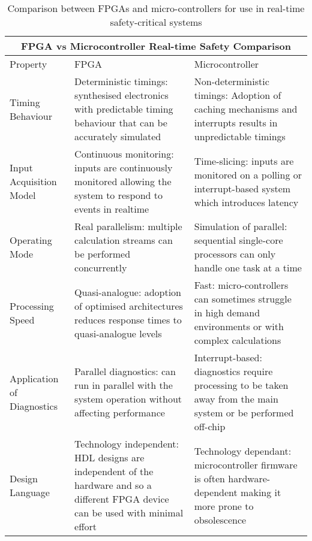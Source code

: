 \begin{table}[t]
\centering
\begin{tabular}{ |p{}|p{}|p{}| }
 \hline
 \multicolumn{3}{|c|}{FPGA vs Microcontroller Real-time Safety Comparison} \\
 \hline
 Property & FPGA & Microcontroller \\
 \hline
 \hline
 Timing Behaviour & Deterministic timings: synthesised electronics with predictable timing behaviour that can be accurately simulated\cite{SalewskiExploring, jabeen, Dubey, tahoori, al-mahmood}  & Non-deterministic timings: Adoption of caching mechanisms and interrupts results in unpredictable timings\cite{SalewskiExploring, wells}   \\
 \hline
 Input Acquisition Model & Continuous monitoring: inputs are continuously monitored allowing the system to respond to events in realtime\cite{SalewskiExploring} & Time-slicing: inputs are monitored on a polling or interrupt-based system which introduces latency\cite{SalewskiExploring} \\

 \hline
 Operating Mode & Real parallelism: multiple calculation streams can be performed concurrently\cite{SalewskiExploring, Gomes, MonmassonDesign, NaouarSliding, SalewskiSystematic, Zhang, Al-Dhaher} & Simulation of parallel: sequential single-core processors can only handle one task at a time\cite{SalewskiExploring, Al-Dhaher}\\
 \hline
 Processing Speed & Quasi-analogue: adoption of optimised architectures reduces response times to quasi-analogue levels\cite{MonmassonFPGADesignMethodology, Idkhajine, Zhang} & Fast: micro-controllers can sometimes struggle in high demand environments or with complex calculations\cite{Zhang} \\
 \hline
 Application of Diagnostics & Parallel diagnostics: can run in parallel with the system operation without affecting performance\cite{Jeppesen} & Interrupt-based: diagnostics require processing to be taken away from the main system or be performed off-chip\cite{SalewskiExploring, Al-Dhaher} \\
 \hline
 Design Language &  Technology independent: HDL designs are independent of the hardware and so a different FPGA device can be used with minimal effort\cite{SalewskiExploring, SalewskiSystematic, Dubey, Zhang, deCastro, Acero} & Technology dependant: microcontroller firmware is often hardware-dependent making it more prone to obsolescence\cite{SalewskiExploring, SalewskiSystematic}   \\
 \hline
\end{tabular}

\caption{Comparison between FPGAs and micro-controllers for use in real-time safety-critical systems}
\label{safety-table}
\end {table}